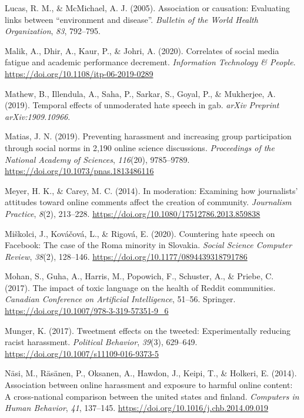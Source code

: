 \documentclass[10pt,dvipsnames]{scrartcl}
\begin{document}
\hypertarget{ref-lucas2005association}{}
Lucas, R. M., \& McMichael, A. J. (2005). Association or causation:
Evaluating links between ``environment and disease''. \emph{Bulletin of
the World Health Organization}, \emph{83}, 792--795.

\hypertarget{ref-malik2020correlates}{}
Malik, A., Dhir, A., Kaur, P., \& Johri, A. (2020). Correlates of social
media fatigue and academic performance decrement. \emph{Information
Technology \& People}. \url{https://doi.org/10.1108/itp-06-2019-0289}

\hypertarget{ref-mathew2019temporal}{}
Mathew, B., Illendula, A., Saha, P., Sarkar, S., Goyal, P., \&
Mukherjee, A. (2019). Temporal effects of unmoderated hate speech in
gab. \emph{arXiv Preprint arXiv:1909.10966}.

\hypertarget{ref-matias2019preventing}{}
Matias, J. N. (2019). Preventing harassment and increasing group
participation through social norms in 2,190 online science discussions.
\emph{Proceedings of the National Academy of Sciences}, \emph{116}(20),
9785--9789. \url{https://doi.org/10.1073/pnas.1813486116}

\hypertarget{ref-meyer2014moderation}{}
Meyer, H. K., \& Carey, M. C. (2014). In moderation: Examining how
journalists' attitudes toward online comments affect the creation of
community. \emph{Journalism Practice}, \emph{8}(2), 213--228.
\url{https://doi.org/10.1080/17512786.2013.859838}

\hypertarget{ref-mivskolci2020countering}{}
Miškolci, J., Kováčová, L., \& Rigová, E. (2020). Countering hate speech
on Facebook: The case of the Roma minority in Slovakia. \emph{Social
Science Computer Review}, \emph{38}(2), 128--146.
\url{https://doi.org/10.1177/0894439318791786}

\hypertarget{ref-mohan2017impact}{}
Mohan, S., Guha, A., Harris, M., Popowich, F., Schuster, A., \& Priebe,
C. (2017). The impact of toxic language on the health of Reddit
communities. \emph{Canadian Conference on Artificial Intelligence},
51--56. Springer. \url{https://doi.org/10.1007/978-3-319-57351-9_6}

\hypertarget{ref-munger2017tweetment}{}
Munger, K. (2017). Tweetment effects on the tweeted: Experimentally
reducing racist harassment. \emph{Political Behavior}, \emph{39}(3),
629--649. \url{https://doi.org/10.1007/s11109-016-9373-5}

\hypertarget{ref-nasi2014association}{}
Näsi, M., Räsänen, P., Oksanen, A., Hawdon, J., Keipi, T., \& Holkeri,
E. (2014). Association between online harassment and exposure to harmful
online content: A cross-national comparison between the united states
and finland. \emph{Computers in Human Behavior}, \emph{41}, 137--145.
\url{https://doi.org/10.1016/j.chb.2014.09.019}
\end{document}
